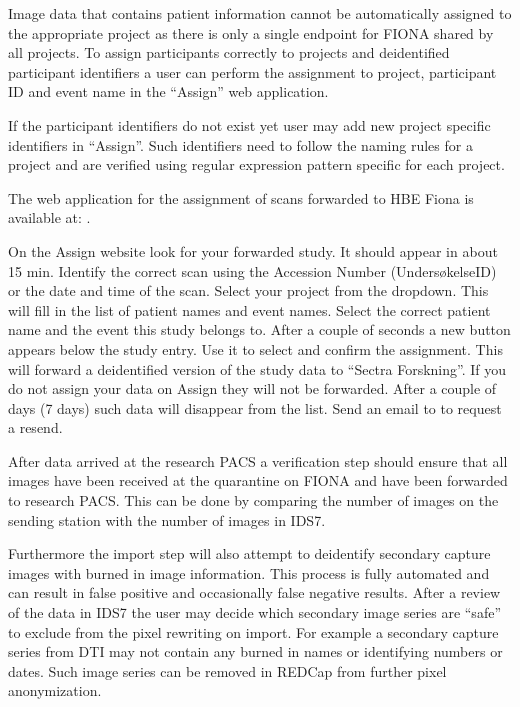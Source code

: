 \documentclass[letterpaper,10pt,english]{sphinxmanual}
\begin{document}
\sphinxAtStartPar
Image data that contains patient information cannot be automatically assigned to the appropriate project as there is only a single endpoint for FIONA shared by all projects. To assign participants correctly to projects and de\sphinxhyphen{}identified participant identifiers a user can perform the assignment to project, participant ID and event name in the “Assign” web application.

\sphinxAtStartPar
If the participant identifiers do not exist yet user may add new project specific identifiers in “Assign”. Such identifiers need to follow the naming rules for a project and are verified using regular expression pattern specific for each project.

\sphinxAtStartPar
The web application for the assignment of scans forwarded to HBE Fiona is available at: .

\sphinxAtStartPar
On the Assign website look for your forwarded study. It should appear in about 15 min.
Identify the correct scan using the Accession Number (Undersøkelse\sphinxhyphen{}ID) or the date and time
of the scan. Select your project from the drop\sphinxhyphen{}down. This will fill in the list of patient names
and event names. Select the correct patient name and the event this study belongs to. After
a couple of seconds a new button appears below the study entry. Use it to select and
confirm the assignment. This will forward a de\sphinxhyphen{}identified version of the study data to “Sectra
Forskning”. If you do not assign your data on Assign they will not be forwarded. After a
couple of days (7 days) such data will disappear from the list. Send an email to  to request a resend.

\sphinxAtStartPar
{}

\sphinxAtStartPar
After data arrived at the research PACS a verification step should ensure that all images have been received at the quarantine on FIONA and have been forwarded to research PACS. This can be done by comparing the number of images on the sending station with the number of images in IDS7.

\sphinxAtStartPar
Furthermore the import step will also attempt to de\sphinxhyphen{}identify secondary capture images with burned in image information. This process is fully automated and can result in false positive and occasionally false negative results. After a review of the data in IDS7 the user may decide which secondary image series are “safe” to exclude from the pixel rewriting on import. For example a secondary capture series from DTI may not contain any burned in names or identifying numbers or dates. Such image series can be removed in REDCap from further pixel anonymization.
\end{document}
